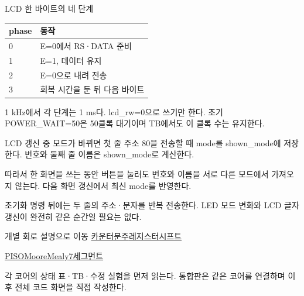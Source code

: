\begin{frame}{LCD 한 바이트의 네 단계}
\small
\begin{center}\renewcommand{\arraystretch}{1.55}\begin{tabular}{ll}
phase & 동작\\\hline
0 & E=0에서 RS·DATA 준비\\
1 & E=1, 데이터 유지\\
2 & E=0으로 내려 전송\\
3 & 회복 시간을 둔 뒤 다음 바이트\\
\end{tabular}\end{center}1 kHz에서 각 단계는 1 ms다. lcd\_rw=0으로 쓰기만 한다. 초기 POWER\_WAIT=50은 50클록 대기이며 TB에서도 이 클록 수는 유지한다.\par
\end{frame}

\begin{frame}{LCD 갱신 중 모드가 바뀌면}
\small
첫 줄 주소 80을 전송할 때 mode를 shown\_mode에 저장한다. 번호와 둘째 줄 이름은 shown\_mode로 계산한다.\par\vspace{0.26cm}따라서 한 화면을 쓰는 동안 버튼을 눌러도 번호와 이름을 서로 다른 모드에서 가져오지 않는다. 다음 화면 갱신에서 최신 mode를 반영한다.\par\vspace{0.26cm}초기화 명령 뒤에는 두 줄의 주소·문자를 반복 전송한다. LED 모드 변화와 LCD 글자 갱신이 완전히 같은 순간일 필요는 없다.\par
\end{frame}

\begin{frame}{개별 회로 설명으로 이동}
\small
\href{05.LAB2_01_COUNTER_VIVADO.pdf}{카운터}\quad\href{05.LAB2_02_CLOCK_DIVIDER_VIVADO.pdf}{분주}\quad\href{05.LAB2_03_REGISTER_VIVADO.pdf}{레지스터}\quad\href{05.LAB2_04_SHIFT_REGISTER_VIVADO.pdf}{시프트}\par\vspace{0.35cm}\href{05.LAB2_05_PISO_VIVADO.pdf}{PISO}\quad\href{05.LAB2_06_MOORE_VIVADO.pdf}{Moore}\quad\href{05.LAB2_07_MEALY_VIVADO.pdf}{Mealy}\quad\href{05.LAB2_08_SEGMENT_SCAN_VIVADO.pdf}{7세그먼트}\par\vspace{0.35cm}각 코어의 상태 표·TB·수정 실험을 먼저 읽는다. 통합판은 같은 코어를 연결하며 이후 전체 코드 화면을 직접 작성한다.\par
\end{frame}

